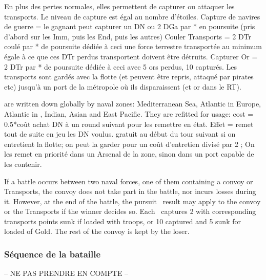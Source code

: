  En plus des pertes normales, elles permettent
de capturer ou attaquer les transports. Le niveau de capture est égal
au nombre d'étoiles.
\bparag Capture de navires de guerre = le gagnant peut capturer un DN ou
2 DGa par * en poursuite        (pris d'abord sur les Imm, puis les End, puis les autres)
\bparag Couler Transports = 2 DTr coulé par * de poursuite dédiée à ceci
       une force terrestre transportée au minimum égale à ce que
       ces DTr perdus transportent doivent être détruits.
\bparag Capturer Or = 2 DTr par * de poursuite dédiée à ceci avec 5 ors perdus, 10 \ducats capturés.
Les transports sont gardés avec la flotte (et peuvent être repris, attaqué par pirates etc)
jusqu'à un port de la métropole où ils disparaissent (et or dans le RT).

  \ND are written down globally by naval zones:
Mediterranean Sea, Atlantic in Europe, Atlantic in \ROTW, Indian, Asian and East Pacific.
They are refitted for usage:
\bparag cost = 0.5*coût achat DN à un round suivant pour les remettre en état.
               Effet = remet tout de suite en jeu les DN voulus.
\bparag gratuit au début du tour suivant si on entretient la flotte;
\bparag on peut la garder  pour un coût d'entretien divisé par 2 ;
\bparag On les remet en priorité dans un Arsenal de la zone, sinon dans un
port capable de les contenir.

 If a battle occurs between two naval forces,
one of them containing a convoy or Transports, the convoy does not take
part in the battle, nor incurs losses during it.
\bparag However, at the end of the battle, the pursuit \textetoilex\
result may apply to the convoy or the Transports if the winner decides
so.
\bparag Each \textetoilex\ captures 2 \NTD with corresponding transports
points sunk if loaded with troops, or 10 \ducats captured and 5 \ducats
sunk for \NTD loaded of Gold.
\bparag The rest of the convoy is kept by the loser.

\subsubsection{Séquence de la bataille}
-- NE PAS PRENDRE EN COMPTE --

